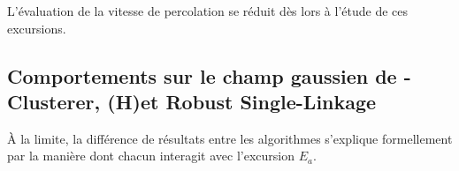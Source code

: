 

L'évaluation de la vitesse de percolation se réduit dès lors à l'étude de ces excursions.

\subsection{Comportements sur le champ gaussien de \HGP-Clusterer, (H)\DBSCAN et Robust Single-Linkage}

À la limite, la différence de résultats entre les algorithmes s'explique formellement par la manière dont chacun interagit avec l'excursion $E_a$. 





